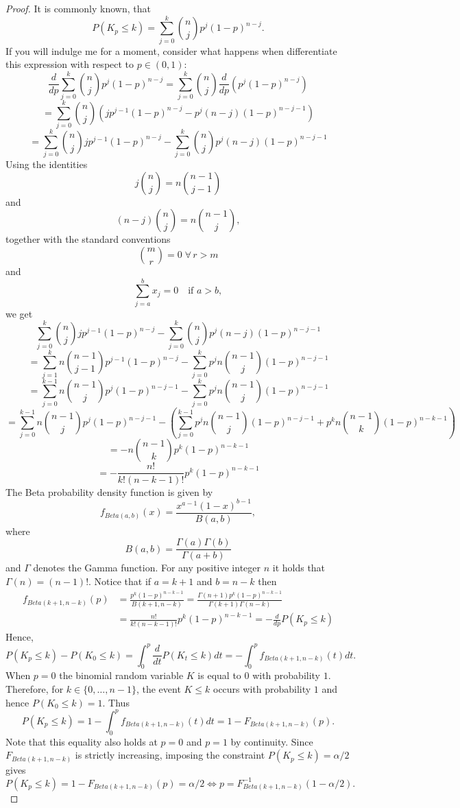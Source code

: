 \documentclass{article}
\begin{document}
\begin{proof}
It is commonly known, that
$$P(K_p\leq k)=\sum_{j=0}^k\binom{n}{j}p^j(1-p)^{n-j}.$$
If you will indulge me for a moment, consider what happens when differentiate this expression with respect to $p\in(0,1)$:
$$\frac{d}{dp}\sum_{j=0}^k\binom{n}{j}p^j(1-p)^{n-j}=\sum_{j=0}^k\binom{n}{j}\frac{d}{dp}\left(p^j(1-p)^{n-j}\right)$$
$$=\sum_{j=0}^k\binom{n}{j}\left(jp^{j-1}(1-p)^{n-j}-p^j(n-j)(1-p)^{n-j-1}\right)$$
$$=\sum_{j=0}^k\binom{n}{j}jp^{j-1}(1-p)^{n-j}-\sum_{j=0}^k\binom{n}{j}p^j(n-j)(1-p)^{n-j-1}$$
Using the identities
$$j\binom{n}{j}=n\binom{n-1}{j-1}$$
and
$$(n-j)\binom{n}{j}=n\binom{n-1}{j},$$
together with the standard conventions
$$\binom{m}{r}=0\;\forall\,r>m$$
and
$$\sum_{j=a}^{b}x_j=0\quad\text{if }a>b,$$
we get
$$\sum_{j=0}^k\binom{n}{j}jp^{j-1}(1-p)^{n-j}-\sum_{j=0}^k\binom{n}{j}p^j(n-j)(1-p)^{n-j-1}$$
$$=\sum_{j=1}^kn\binom{n-1}{j-1}p^{j-1}(1-p)^{n-j}-\sum_{j=0}^kp^jn\binom{n-1}{j}(1-p)^{n-j-1}$$
$$=\sum_{j=0}^{k-1}n\binom{n-1}{j}p^j(1-p)^{n-j-1}-\sum_{j=0}^kp^jn\binom{n-1}{j}(1-p)^{n-j-1}$$
$$=\sum_{j=0}^{k-1}n\binom{n-1}{j}p^j(1-p)^{n-j-1}-\left(\sum_{j=0}^{k-1}p^jn\binom{n-1}{j}(1-p)^{n-j-1}+p^kn\binom{n-1}{k}(1-p)^{n-k-1}\right)$$
$$=-n\binom{n-1}{k}p^k(1-p)^{n-k-1}$$
$$=-\frac{n!}{k!(n-k-1)!}p^k(1-p)^{n-k-1}$$
The Beta probability density function is given by
$$f_{Beta(a,b)}(x)=\frac{x^{a-1}(1-x)^{b-1}}{B(a,b)},$$
where
$$B(a,b)=\frac{\Gamma(a)\Gamma(b)}{\Gamma(a+b)}$$
and $\Gamma$ denotes the Gamma function. For any positive integer $n$ it holds that $\Gamma(n)=(n-1)!$. Notice that if $a=k+1$ and $b=n-k$ then
$$\begin{aligned}
    f_{Beta(k+1,n-k)}(p)&=\frac{p^k(1-p)^{n-k-1}}{B(k+1,n-k)}=\frac{\Gamma(n+1)p^k(1-p)^{n-k-1}}{\Gamma(k+1)\Gamma(n-k)}\\
    &=\frac{n!}{k!(n-k-1)!}p^k(1-p)^{n-k-1}=-\frac{d}{dp}P(K_p\leq k)
\end{aligned}$$
Hence,
$$P(K_p\leq k)-P(K_0\leq k)=\int_0^p\frac{d}{dt}P(K_t\leq k)dt=-\int_0^p f_{Beta(k+1,n-k)}(t)dt.$$
When $p=0$ the binomial random variable $K$ is equal to $0$ with probability $1$. Therefore, for $k\in\{0,\ldots,n-1\}$, the event $K\leq k$ occurs with probability $1$ and hence $P(K_0\leq k)=1$. Thus
$$P(K_p\leq k)=1-\int_0^p f_{Beta(k+1,n-k)}(t)dt=1-F_{Beta(k+1,n-k)}(p).$$
Note that this equality also holds at $p=0$ and $p=1$ by continuity.
Since $F_{Beta(k+1,n-k)}$ is strictly increasing, imposing the constraint $P(K_p\leq k)=\alpha/2$ gives
$$P(K_p\leq k)=
1-F_{Beta(k+1,n-k)}(p)=\alpha/2
\Leftrightarrow
p=F_{Beta(k+1,n-k)}^{-1}(1-\alpha/2).$$
\end{proof}
\end{document}
